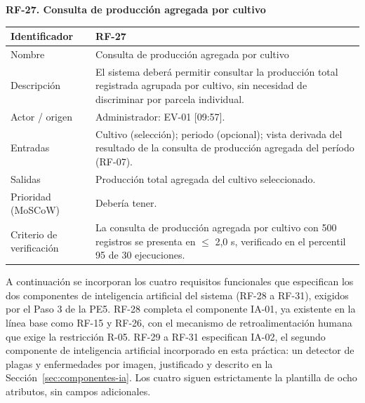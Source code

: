 \documentclass[12pt,a4paper]{article}
\begin{document}
\begin{minipage}{\linewidth}
\bigskip
\noindent\textbf{RF-27. Consulta de producción agregada por cultivo}
\label{tab:RF-27}

\begin{center}
\begin{tabular}{|p{3.5cm}|p{10.7cm}|}
\hline
Identificador & RF-27 \\
\hline
Nombre & Consulta de producción agregada por cultivo \\
\hline
Descripción & El sistema deberá permitir consultar la producción total registrada agrupada por cultivo, sin necesidad de discriminar por parcela individual. \\
\hline
Actor / origen & Administrador: EV-01 [09:57]. \\
\hline
Entradas & Cultivo (selección); periodo (opcional); vista derivada del resultado de la consulta de producción agregada del período (RF-07). \\
\hline
Salidas & Producción total agregada del cultivo seleccionado. \\
\hline
Prioridad (MoSCoW) & Debería tener. \\
\hline
Criterio de verificación & La consulta de producción agregada por cultivo con 500 registros se presenta en $\leq$ 2,0 s, verificado en el percentil 95 de 30 ejecuciones. \\
\hline
\end{tabular}
\end{center}
\end{minipage}

A continuación se incorporan los cuatro requisitos funcionales que especifican los dos componentes de inteligencia artificial del sistema (RF-28 a RF-31), exigidos por el Paso 3 de la PE5. RF-28 completa el componente IA-01, ya existente en la línea base como RF-15 y RF-26, con el mecanismo de retroalimentación humana que exige la restricción R-05. RF-29 a RF-31 especifican IA-02, el segundo componente de inteligencia artificial incorporado en esta práctica: un detector de plagas y enfermedades por imagen, justificado y descrito en la Sección~\ref{sec:componentes-ia}. Los cuatro siguen estrictamente la plantilla de ocho atributos, sin campos adicionales.
\end{document}
